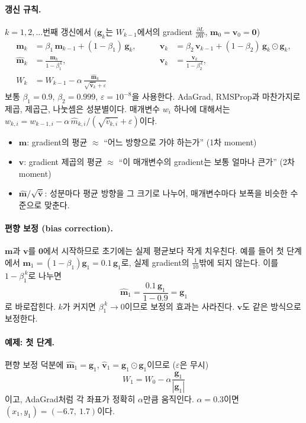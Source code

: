 \documentclass[11pt,a4paper]{article}
\newcommand{\pd}[2]{\frac{\partial #1}{\partial #2}}
\begin{document}
\paragraph{갱신 규칙.}
$k=1,2,\ldots$번째 갱신에서 ($\bm g_k$는 $W_{k-1}$에서의 gradient $\pd{L}{W}$, $\bm m_0=\bm v_0=\bm 0$)
\[
\boxed{
\begin{aligned}
\bm m_k&=\beta_1\,\bm m_{k-1}+(1-\beta_1)\,\bm g_k,
&\qquad
\bm v_k&=\beta_2\,\bm v_{k-1}+(1-\beta_2)\,\bm g_k\odot\bm g_k,\\[4pt]
\hat{\bm m}_k&=\frac{\bm m_k}{1-\beta_1^{\,k}},
&\qquad
\hat{\bm v}_k&=\frac{\bm v_k}{1-\beta_2^{\,k}},\\[4pt]
W_k&=W_{k-1}-\alpha\,\frac{\hat{\bm m}_k}{\sqrt{\hat{\bm v}_k}+\varepsilon}
\end{aligned}
}
\]
보통 $\beta_1=0.9$, $\beta_2=0.999$, $\varepsilon=10^{-8}$을 사용한다.
AdaGrad, RMSProp과 마찬가지로 제곱, 제곱근, 나눗셈은 성분별이다.
매개변수 $w_i$ 하나에 대해서는 $w_{k,i}=w_{k-1,i}-\alpha\,\hat m_{k,i}/(\sqrt{\hat v_{k,i}}+\varepsilon)$이다.
\begin{itemize}[leftmargin=1.8em]
\item $\bm m$: gradient의 평균 $\approx$ ``어느 방향으로 가야 하는가'' (1차 moment)
\item $\bm v$: gradient 제곱의 평균 $\approx$ ``이 매개변수의 gradient는 보통 얼마나 큰가'' (2차 moment)
\item $\hat{\bm m}/\sqrt{\hat{\bm v}}$: 성분마다 평균 방향을 그 크기로 나누어, 매개변수마다 보폭을 비슷한 수준으로 맞춘다.
\end{itemize}

\paragraph{편향 보정 (bias correction).}
$\bm m$과 $\bm v$를 $\bm 0$에서 시작하므로 초기에는 실제 평균보다 작게 치우친다.
예를 들어 첫 단계에서 $\bm m_1=(1-\beta_1)\bm g_1=0.1\,\bm g_1$로, 실제 gradient의 $\frac{1}{10}$밖에 되지 않는다.
이를 $1-\beta_1^{\,k}$로 나누면
\[
\hat{\bm m}_1=\frac{0.1\,\bm g_1}{1-0.9}=\bm g_1
\]
로 바로잡힌다. $k$가 커지면 $\beta_1^{\,k}\to0$이므로 보정의 효과는 사라진다.
$\bm v$도 같은 방식으로 보정한다.

\paragraph{예제: 첫 단계.}
편향 보정 덕분에 $\hat{\bm m}_1=\bm g_1$, $\hat{\bm v}_1=\bm g_1\odot\bm g_1$이므로 ($\varepsilon$은 무시)
\[
W_1=W_0-\alpha\frac{\bm g_1}{|\bm g_1|}
\]
이고, AdaGrad처럼 각 좌표가 정확히 $\alpha$만큼 움직인다.
$\alpha=0.3$이면 $(x_1,y_1)=(-6.7,\ 1.7)$이다.
\end{document}
